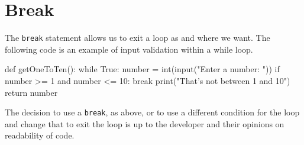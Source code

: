 \section*{Break}
The \texttt{break} statement allows us to exit a loop as and where we want. The following code is an example of input validation within a while loop.
\begin{python}
def getOneToTen():
    while True:
        number = int(input("Enter a number: "))
        if number >= 1 and number <= 10:
            break
        print("That’s not between 1 and 10")
    return number
\end{python}

The decision to use a \texttt{break}, as above, or to use a different condition for the loop and change that to exit the loop is up to the developer and their opinions on readability of code.
